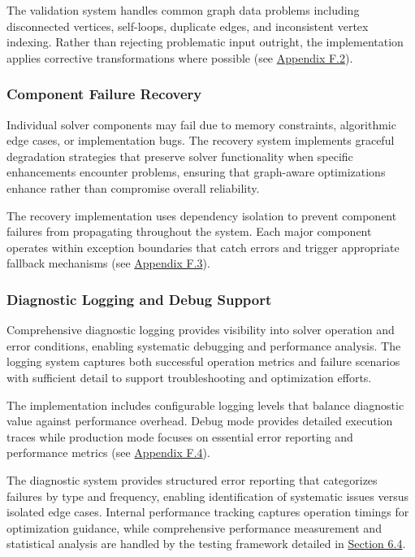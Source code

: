 The validation system handles common graph data problems including disconnected vertices, self-loops, duplicate edges, and inconsistent vertex indexing. Rather than rejecting problematic input outright, the implementation applies corrective transformations where possible (see \hyperref[appendix:input-validation]{Appendix F.2}).

\subsubsection{Component Failure Recovery}

Individual solver components may fail due to memory constraints, algorithmic edge cases, or implementation bugs. The recovery system implements graceful degradation strategies that preserve solver functionality when specific enhancements encounter problems, ensuring that graph-aware optimizations enhance rather than compromise overall reliability.

The recovery implementation uses dependency isolation to prevent component failures from propagating throughout the system. Each major component operates within exception boundaries that catch errors and trigger appropriate fallback mechanisms (see \hyperref[appendix:component-recovery]{Appendix F.3}).

\subsubsection{Diagnostic Logging and Debug Support}

Comprehensive diagnostic logging provides visibility into solver operation and error conditions, enabling systematic debugging and performance analysis. The logging system captures both successful operation metrics and failure scenarios with sufficient detail to support troubleshooting and optimization efforts.

The implementation includes configurable logging levels that balance diagnostic value against performance overhead. Debug mode provides detailed execution traces while production mode focuses on essential error reporting and performance metrics (see \hyperref[appendix:diagnostic-logging]{Appendix F.4}).

The diagnostic system provides structured error reporting that categorizes failures by type and frequency, enabling identification of systematic issues versus isolated edge cases. Internal performance tracking captures operation timings for optimization guidance, while comprehensive performance measurement and statistical analysis are handled by the testing framework detailed in \hyperref[sec:statistical-methodology]{Section 6.4}.

